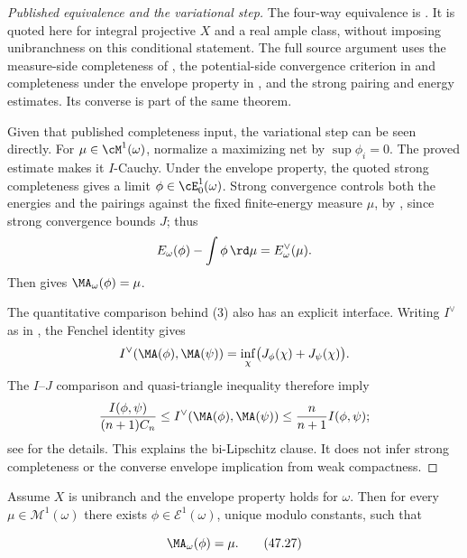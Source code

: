 \begin{proof}[Published equivalence and the variational step]
The four-way equivalence is \cite[Theorem~12.8]{BJ22}.
It is quoted here for integral projective $X$ and a real ample class,
without imposing unibranchness on this conditional statement.
The full source argument uses the measure-side completeness of
\cite[Theorem~10.14]{BJ22}, the potential-side convergence criterion
in \cite[Theorem~12.4]{BJ22} and completeness under the envelope
property in \cite[Theorem~12.8]{BJ22}, and the strong pairing
and energy estimates. Its converse is part of the same theorem.

Given that published completeness input, the variational step
can be seen directly.
For $\mu\in\cM^1(\omega)$, normalize a maximizing net by
$\sup\phi_i=0$. The proved estimate
 makes it $I$-Cauchy.
Under the envelope property, the quoted strong completeness gives a limit
$\phi\in\cE^1_0(\omega)$. Strong convergence controls both the energies
and the pairings against the fixed finite-energy measure $\mu$, by
\cite[Proposition~9.19]{BJ22}, since strong convergence bounds $J$; thus
\[
 E_\omega(\phi)-\int\phi\,\rd\mu=E^\vee_\omega(\mu).
\]
Then  gives $\MA_\omega(\phi)=\mu$.

The quantitative comparison behind (3) also has an explicit interface.
Writing $I^\vee$ as in , the Fenchel
identity gives
\[
 I^\vee(\MA(\phi),\MA(\psi))
   =\inf_\chi\bigl(J_\phi(\chi)+J_\psi(\chi)\bigr).
\]
The $I$--$J$ comparison and quasi-triangle inequality therefore imply
\[
 \frac{I(\phi,\psi)}{(n+1)C_n}
 \le I^\vee(\MA(\phi),\MA(\psi))
 \le\frac n{n+1}I(\phi,\psi);
\]
see  for the details.
This explains the bi-Lipschitz clause. It does not infer strong
completeness or the converse envelope implication from weak compactness.
\end{proof}

\begin{corollary}\label{cor:bj-cy-unibranch}
Assume $X$ is unibranch and the envelope property holds for $\omega$.
Then for every $\mu\in\mathcal M^1(\omega)$
there exists $\phi\in\mathcal E^1(\omega)$, unique modulo constants, such
that

\[
                              \MA_\omega(\phi)=\mu.
\tag{47.27}\label{eq:bj-cy-equation}
\]
\end{corollary}

